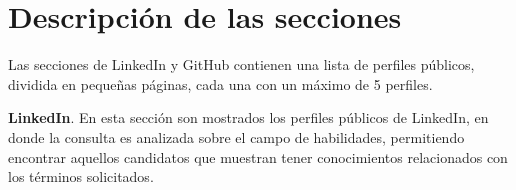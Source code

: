 \section{Descripción de las secciones}
\label{sec:sec05}

Las secciones de LinkedIn y GitHub contienen una lista de perfiles públicos, dividida en pequeñas páginas, cada una con un máximo de 5 perfiles.

\textbf{LinkedIn}. En esta sección son mostrados los perfiles públicos de LinkedIn, en donde la consulta es analizada sobre el campo de habilidades, permitiendo encontrar aquellos candidatos que muestran tener conocimientos relacionados con los términos solicitados. 

\begin{figure}[H]
\centering
\begin{minipage}{3.3cm}
    \centering
\end{minipage}
\hspace{2cm}
\begin{minipage}{3.3cm}
    \centering
\end{minipage}


\end{figure}
